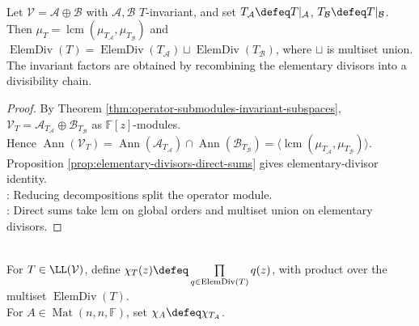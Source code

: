 \begin{theorem} \label{thm:reducing-decompositions-combine-elementary-divisors} \\
Let $\mathcal{V}=\mathcal{A}\oplus\mathcal{B}$ with $\mathcal{A},\mathcal{B}$ $T$-invariant, and set $T_{\mathcal{A}}\defeq T|_{\mathcal{A}}$, $T_{\mathcal{B}}\defeq T|_{\mathcal{B}}$.\\
Then $\mu_T=\operatorname{lcm}(\mu_{T_{\mathcal{A}}},\mu_{T_{\mathcal{B}}})$ and $\operatorname{ElemDiv}(T)=\operatorname{ElemDiv}(T_{\mathcal{A}})\sqcup\operatorname{ElemDiv}(T_{\mathcal{B}})$, where $\sqcup$ is multiset union.\\
The invariant factors are obtained by recombining the elementary divisors into a divisibility chain.
\begin{proof}
By Theorem \ref{thm:operator-submodules-invariant-subspaces}, $\mathcal{V}_T=\mathcal{A}_{T_{\mathcal{A}}}\oplus\mathcal{B}_{T_{\mathcal{B}}}$ as $\mathbb{F}[z]$-modules.\\
Hence $\operatorname{Ann}(\mathcal{V}_T)=\operatorname{Ann}(\mathcal{A}_{T_{\mathcal{A}}})\cap\operatorname{Ann}(\mathcal{B}_{T_{\mathcal{B}}})=\langle\operatorname{lcm}(\mu_{T_{\mathcal{A}}},\mu_{T_{\mathcal{B}}})\rangle$.\\
Proposition \ref{prop:elementary-divisors-direct-sums} gives elementary-divisor identity.\\
: Reducing decompositions split the operator module.\\
: Direct sums take lcm on global orders and multiset union on elementary divisors.
\end{proof}
\end{theorem}

\begin{definition} \label{def:characteristic-polynomial-from-elementary-divisors} \\
For $T\in\LL(\mathcal{V})$, define $\chi_T(z)\defeq\prod\limits_{q\in\operatorname{ElemDiv}(T)}q(z)$, with product over the multiset $\operatorname{ElemDiv}(T)$.\\
For $A\in\operatorname{Mat}(n,n,\mathbb{F})$, set $\chi_A\defeq\chi_{T_A}$.
\end{definition}

